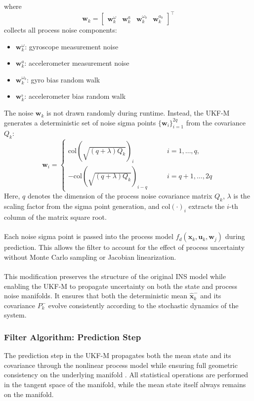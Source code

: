 where
$$
    \mathbf{w}_k = 
    \begin{bmatrix}
        \mathbf{w}^{\omega}_k & \mathbf{w}^{a}_k & \mathbf{w}^{\omega_b}_k & \mathbf{w}^{a_b}_k
    \end{bmatrix}^\top
$$
collects all process noise components:
\begin{itemize}
    \item $\mathbf{w}^{\omega}_k$: gyroscope measurement noise
    \item $\mathbf{w}^{a}_k$: accelerometer measurement noise
    \item $\mathbf{w}^{\omega_b}_k$: gyro bias random walk
    \item $\mathbf{w}^{_b}_k$: accelerometer bias random walk
\end{itemize}
The noise $\mathbf{w}_k$ is not drawn randomly during runtime. Instead, the UKF-M generates a deterministic set of noise sigma points $\{\mathbf{w}_i\}_{i=1}^{2q}$ from the covariance $Q_k$:
$$
    \mathbf{w}_i = 
    \begin{cases}
        \text{col}\left(\sqrt{(q+\lambda)Q_k}\right)_i \qquad &i = 1,\ldots,q, \\
        -\text{col}\left(\sqrt{(q+\lambda)Q_k}\right)_{i-q} \qquad &i = q+1,\ldots,2q
    \end{cases}
$$
Here, $q$ denotes the dimension of the process noise covariance matrix $Q_k$, $\lambda$ is the scaling factor from the sigma point generation, and $\text{col}(\cdot)_i$ extracts the $i$-th column of the matrix square root. 
\\ \\
Each noise sigma point is passed into the process model $f_d(\mathbf{x}_k, \mathbf{u}_k, \mathbf{w}_j)$ during prediction. This allows the filter to account for the effect of process uncertainty without Monte Carlo sampling or Jacobian linearization.
\\ \\
This modification preserves the structure of the original INS model while enabling the UKF-M to propagate uncertainty on both the state and process noise manifolds. It ensures that both the deterministic mean $\hat{\mathbf{x}}_k^-$ and its covariance $P_k^-$ evolve consistently according to the stochastic dynamics of the system.



\subsubsection{Filter Algorithm: Prediction Step}
The prediction step in the UKF-M propagates both the mean state and its covariance through the nonlinear process model while ensuring full geometric consistency on the underlying manifold \cite{ukf_manifold_code}. All statistical operations are performed in the tangent space of the manifold, while the mean state itself always remains on the manifold.


